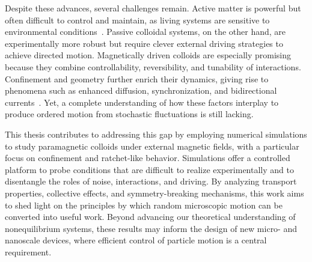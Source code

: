 Despite these advances, several challenges remain. Active matter is powerful but often difficult to control and maintain, as living systems are sensitive to environmental conditions~\cite{bechinger2016active}. Passive colloidal systems, on the other hand, are experimentally more robust but require clever external driving strategies to achieve directed motion. Magnetically driven colloids are especially promising because they combine controllability, reversibility, and tunability of interactions. Confinement and geometry further enrich their dynamics, giving rise to phenomena such as enhanced diffusion, synchronization, and bidirectional currents~\cite{tierno2012depinning, straube2014tunable, ostinato2024magnetically}. Yet, a complete understanding of how these factors interplay to produce ordered motion from stochastic fluctuations is still lacking.

This thesis contributes to addressing this gap by employing numerical simulations to study paramagnetic colloids under external magnetic fields, with a particular focus on confinement and ratchet-like behavior. Simulations offer a controlled platform to probe conditions that are difficult to realize experimentally and to disentangle the roles of noise, interactions, and driving. By analyzing transport properties, collective effects, and symmetry-breaking mechanisms, this work aims to shed light on the principles by which random microscopic motion can be converted into useful work. Beyond advancing our theoretical understanding of nonequilibrium systems, these results may inform the design of new micro- and nanoscale devices, where efficient control of particle motion is a central requirement.

\newpage

